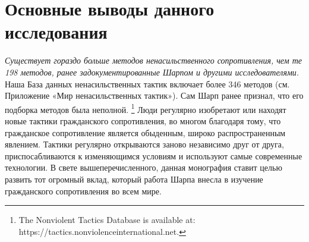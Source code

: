 \documentclass[twoside,a4paper,12pt,fleqn,openany]{extbook}
\newcommand{\ml}[2]{#2}
\begin{document}
\section*{\ml{Main Findings of this Study}{Основные выводы данного исследования}}

\ml
{There are more methods of nonviolent civil resistance beyond the 198 methods previously documented by Sharp and other scholars.}
{\emph{Существует гораздо больше методов ненасильственного сопротивления, чем те 198 методов, ранее задокументированные Шарпом и другими исследователями.}}
\ml
{Our current Nonviolent Tactics Database includes more than 346 methods (see Universe of Nonviolent Tactics Appendix).}
{Наша База данных ненасильственных тактик включает более 346 методов (см. Приложение «Мир ненасильственных тактик»).}
\ml
{Sharp was the first to admit that his compilation of methods was incomplete.}
{Сам Шарп ранее признал, что его подборка методов была неполной.}
\footnote{The Nonviolent Tactics Database is available at: https://tactics.nonviolenceinternational.net.}
\ml
{New civil resistance tactics are regularly being invented or recognized precisely because civil resistance is a widespread, continuous occurrence in a multitude of societies and contexts, perpetually reinventing itself to accommodate for shifting conditions or to utilize new technologies of the day.}
{Люди регулярно изобретают или находят новые тактики гражданского сопротивления, во многом благодаря тому, что гражданское сопротивление является обыденным, широко распространенным явлением. Тактики регулярно открываются заново независимо друг от друга, приспосабливаются к изменяющимся условиям и используют самые современные технологии.}
\ml
{Taking this into account, this monograph seeks to build on the enormous contribution that Sharp’s work has made to the study of civil resistance worldwide.}
{В свете вышеперечисленного, данная монография ставит целью развить тот огромный вклад, который работа Шарпа внесла в изучение гражданского сопротивления во всем мире.}
\end{document}
